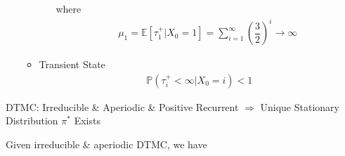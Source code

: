 \begin{itemize}[topsep=2pt,itemsep=0pt]
\begin{itemize}[topsep=2pt,itemsep=0pt]
\begin{itemize}[topsep=2pt,itemsep=0pt]
\begin{center}
                \end{center}

                where 
                \begin{align*}
                    \mu _1=\mathbb{E}\left[ \tau_1^+|X_0=1 \right]=\sum_{i=1}^\infty \left(\dfrac{3}{2}\right)^i\to\infty   
                \end{align*}
                
                

            \end{itemize} 
            \item Transient State
            \begin{align*}
                \mathbb{P}\left( \tau_i^+<\infty|X_0=i    \right)<1 
            \end{align*}
        \end{itemize}
        
            
    \end{itemize}
    
\begin{point}
    DTMC: Irreducible \& Aperiodic \& Positive Recurrent $ \Rightarrow  $ Unique Stationary Distribution $ \pi^* $ Exists
\end{point}

Given irreducible \& aperiodic DTMC, we have 

